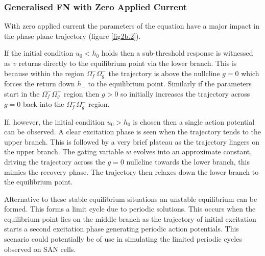    \subsubsection{Generalised FN with Zero Applied Current}
    With zero applied current the parameters of the equation have a major impact in the phase plane trajectory (figure \ref{fig2b.2}).\par
    If the initial condition $u_0 < h_0$ holds then a sub-threshold response is witnessed as $v$ returns directly to the equilibrium point via the lower branch. This is because within the region $\Omega _{f}^{-} \Omega _{g}^{-}$ the trajectory is above the nullcline $g=0$ which forces the return down $h_-$ to the equilibrium point. Similarly if the parameters start in the $\Omega _{f}^{-} \Omega _{g}^{+}$ region then $g>0$ so initially increases the trajectory across $g=0$ back into the $\Omega _{f}^{-} \Omega _{g}^{-}$ region. \par
    If, however, the initial condition $u_0>h_0$ is chosen then a single action potential can be observed. A clear excitation phase is seen when the trajectory tends to the upper branch. This is followed by a very brief plateau as the trajectory lingers on the upper branch. The gating variable $w$ evolves into an approximate constant, driving the trajectory across the $g=0$ nullcline towards the lower branch, this mimics the recovery phase. The trajectory then relaxes down the lower branch to the equilibrium point. \par
    Alternative to these stable equilibrium situations an unstable equilibrium can be formed. This forms a limit cycle due to periodic solutions. This occurs when the equilibrium point lies on the middle branch as the trajectory of initial excitation starts a second excitation phase generating periodic action potentials. This scenario could potentially be of use in simulating the limited periodic cycles observed on SAN cells.
